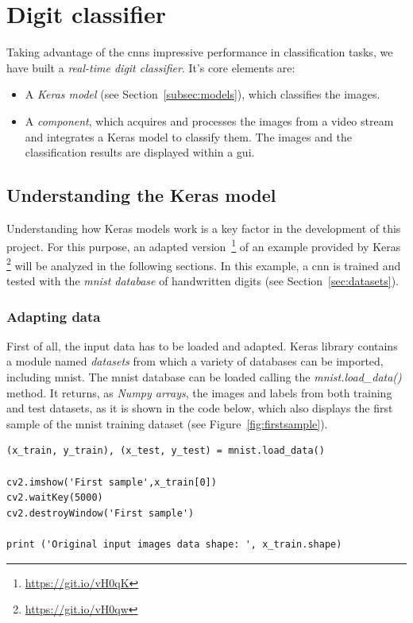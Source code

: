 \chapter{Digit classifier}\label{ch:digitclass}
Taking advantage of the \glspl{cnn} impressive performance in classification tasks, we have built a \emph{real-time digit classifier}. It's core elements are:
\begin{itemize}
	\item A \emph{Keras model} (see Section~\ref{subsec:models}), which classifies the images.
	\item A \emph{component}, which acquires and processes the images from a video stream and integrates a Keras model to classify them. The images and the classification results are displayed within a \gls{gui}.
\end{itemize}

\section{Understanding the Keras model}\label{sec:understanding}
Understanding how Keras models work is a key factor in the development of this project. For this purpose, an adapted version~\footnote{\url{https://git.io/vH0qK}} of an example provided by Keras \footnote{\url{https://git.io/vH0qw}} will be analyzed in the following sections. In this example, a \gls{cnn} is trained and tested with the \emph{\gls{mnist} database} of handwritten digits (see Section~\ref{sec:datasets}).

\subsection{Adapting data}\label{subsec:adaptdata}
First of all, the input data has to be loaded and adapted. Keras library contains a module named \textit{datasets} from which a variety of databases can be imported, including \gls{mnist}. The \gls{mnist} database can be loaded calling the \textit{mnist.load\_data()} method. It returns, as \emph{Numpy arrays}, the images and labels from both training and test datasets, as it is shown in the code below, which also displays the first sample of the \gls{mnist} training dataset (see Figure~\ref{fig:firstsample}).
\begin{lstlisting}
(x_train, y_train), (x_test, y_test) = mnist.load_data()

cv2.imshow('First sample',x_train[0])
cv2.waitKey(5000)
cv2.destroyWindow('First sample')

print ('Original input images data shape: ', x_train.shape) 
\end{lstlisting}

